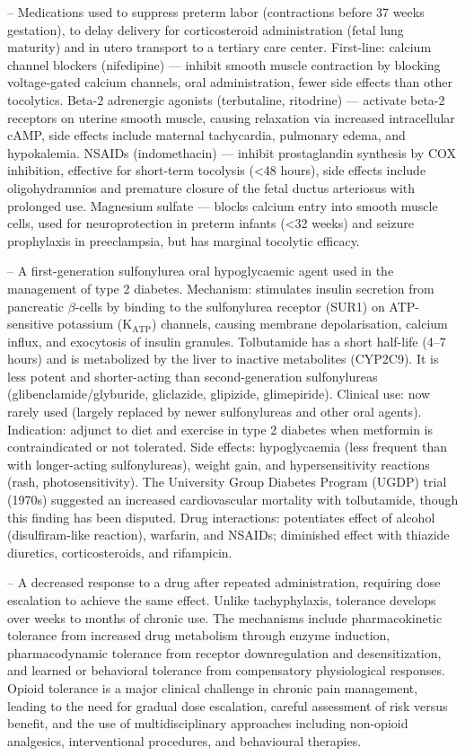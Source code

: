 -- Medications used to suppress preterm labor (contractions before 37 weeks gestation), to delay delivery for corticosteroid administration (fetal lung maturity) and in utero transport to a tertiary care center. First-line: calcium channel blockers (nifedipine) — inhibit smooth muscle contraction by blocking voltage-gated calcium channels, oral administration, fewer side effects than other tocolytics. Beta-2 adrenergic agonists (terbutaline, ritodrine) — activate beta-2 receptors on uterine smooth muscle, causing relaxation via increased intracellular cAMP, side effects include maternal tachycardia, pulmonary edema, and hypokalemia. NSAIDs (indomethacin) — inhibit prostaglandin synthesis by COX inhibition, effective for short-term tocolysis (<48 hours), side effects include oligohydramnios and premature closure of the fetal ductus arteriosus with prolonged use. Magnesium sulfate — blocks calcium entry into smooth muscle cells, used for neuroprotection in preterm infants (<32 weeks) and seizure prophylaxis in preeclampsia, but has marginal tocolytic efficacy.

-- A first-generation sulfonylurea oral hypoglycaemic agent used in the management of type 2 diabetes. Mechanism: stimulates insulin secretion from pancreatic $\beta$-cells by binding to the sulfonylurea receptor (SUR1) on ATP-sensitive potassium ($\mathrm{K}_{\mathrm{ATP}}$) channels, causing membrane depolarisation, calcium influx, and exocytosis of insulin granules. Tolbutamide has a short half-life (4--7 hours) and is metabolized by the liver to inactive metabolites (CYP2C9). It is less potent and shorter-acting than second-generation sulfonylureas (glibenclamide/glyburide, gliclazide, glipizide, glimepiride). Clinical use: now rarely used (largely replaced by newer sulfonylureas and other oral agents). Indication: adjunct to diet and exercise in type 2 diabetes when metformin is contraindicated or not tolerated. Side effects: hypoglycaemia (less frequent than with longer-acting sulfonylureas), weight gain, and hypersensitivity reactions (rash, photosensitivity). The University Group Diabetes Program (UGDP) trial (1970s) suggested an increased cardiovascular mortality with tolbutamide, though this finding has been disputed. Drug interactions: potentiates effect of alcohol (disulfiram-like reaction), warfarin, and NSAIDs; diminished effect with thiazide diuretics, corticosteroids, and rifampicin.

-- A decreased response to a drug after repeated administration, requiring dose escalation to achieve the same effect. Unlike tachyphylaxis, tolerance develops over weeks to months of chronic use. The mechanisms include pharmacokinetic tolerance from increased drug metabolism through enzyme induction, pharmacodynamic tolerance from receptor downregulation and desensitization, and learned or behavioral tolerance from compensatory physiological responses. Opioid tolerance is a major clinical challenge in chronic pain management, leading to the need for gradual dose escalation, careful assessment of risk versus benefit, and the use of multidisciplinary approaches including non-opioid analgesics, interventional procedures, and behavioural therapies.

